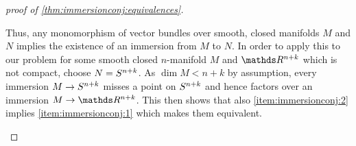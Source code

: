 \begin{proof}[proof of \autoref{thm:immersionconj:equivalences}]
\begin{description}
    Thus, any monomorphism of vector bundles over smooth, closed
    manifolds $M$ and $N$ implies the existence of an immersion from $M$
    to $N$.
    In order to apply this to our problem for some smooth closed
    $n$-manifold $M$ and $\R^{n+k}$ which is not compact, choose
    $N=S^{n+k}$. As $\dim M<n+k$ by assumption, every immersion
    $M\to S^{n+k}$ misses a point on $S^{n+k}$ and hence
    factors over an immersion $M\to\R^{n+k}$.
    This then shows that also \ref{item:immersionconj:2} implies
    \ref{item:immersionconj:1} which makes them equivalent.
  \end{description}
\end{proof}


